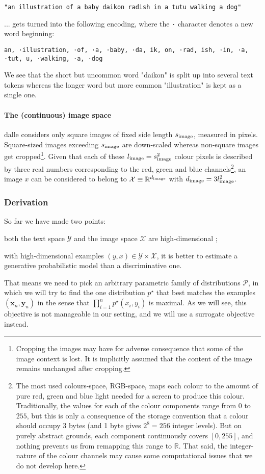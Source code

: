 \documentclass{article}
\begin{document}
\begin{multicols}{2}
\texttt{"an illustration of a baby daikon radish in a tutu walking a dog"}

... gets turned into the following encoding, where the \verb+·+ character denotes a new word beginning:

\texttt{an, ·illustration, ·of, ·a, ·baby, ·da, ik, on, ·rad, ish, ·in, ·a, ·tut, u, ·walking, ·a, ·dog}

We see that the short but uncommon word "daikon" is split up into several text tokens whereas the longer word but more common "illustration" is kept as a single one.

\paragraph{The (continuous) image space}

\gls{dalle} considers only square images of fixed side length $s_{\mathrm{image}}$, measured in pixels.
Square-sized images exceeding $s_{\mathrm{image}}$ are down-scaled whereas non-square images get cropped\footnote{
Cropping the images may have for adverse consequence that some of the image context is lost. It is implicitly assumed that the content of the image remains unchanged after cropping.
}.
Given that each of these $l_{\mathrm{image}}=s_{\mathrm{image}}^2$ colour pixels is described by three real numbers corresponding to the red, green and blue channels\footnote{
The most used colours-space, RGB-space, maps each colour to the amount of pure red, green and blue light needed for a screen to produce this colour. Traditionally, the values for each of the colour components range from 0 to $255$, but this is only a consequence of the storage convention that a colour should occupy 3 bytes (and 1 byte gives $2^8=256$ integer levels). But on purely abstract grounds, each component continuously covers $[0,255]$, and nothing prevents us from remapping this range to $\mathbb{R}$.
That said, the integer-nature of the colour channels may cause some computational issues that we do not develop here.
}, an image $x$ can be considered to belong to $\mathcal{X}\equiv \mathbb{R}^{d_{\mathrm{image}}}$ with $d_{\mathrm{image}}=3l_{\mathrm{image}}^2$.

\subsubsection{Derivation}

So far we have made two points: \begin{enumerate*}[label=(\roman*)]
\item both the text space $\mathcal{Y}$ and the image space $\mathcal{X}$ are high-dimensional ;
\item with high-dimensional examples $(y,x)\in\mathcal{Y}\times\mathcal{X}$, it is better to estimate a generative probabilistic model than a discriminative one.
\end{enumerate*}
That means we need to pick an arbitrary parametric family of distributions $\mathcal{P}$, in which we will try to find the one distribution $p^\star$ that best matches the examples $(\mathbf{x}_n,\mathbf{y}_n)$ in the sense that $\prod_{i=1}^{n} p^\star(x_i,y_i)$ is maximal. As we will see, this objective is not manageable in our setting, and we will use a surrogate objective instead.


\end{multicols}
\end{document}
